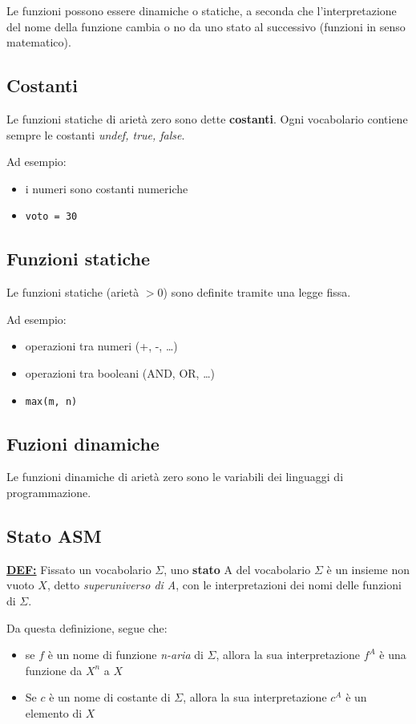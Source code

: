 \noindent Le funzioni possono essere dinamiche o statiche, a seconda che l'interpretazione 
del nome della funzione cambia o no da uno stato al successivo (funzioni 
in senso matematico).

\subsection{Costanti}
Le funzioni statiche di arietà zero sono dette \textbf{costanti}. Ogni 
vocabolario contiene sempre le costanti \textit{undef, true, false}.

\noindent Ad esempio:
\begin{itemize}
    \item i numeri sono costanti numeriche
    \item \texttt{voto = 30}
\end{itemize}


\subsection{Funzioni statiche}
Le funzioni statiche (arietà $>0$) sono definite tramite una legge fissa.

\noindent Ad esempio:
\begin{itemize}
    \item operazioni tra numeri (+, -, \dots)
    \item operazioni tra booleani (AND, OR, \dots)
    \item \texttt{max(m, n)}
\end{itemize}

\subsection{Fuzioni dinamiche}
Le funzioni dinamiche di arietà zero sono le variabili dei linguaggi 
di programmazione.

\subsection{Stato ASM}
\underline{\textbf{DEF:}} Fissato un vocabolario $\Sigma$, uno \textbf{stato} A del 
vocabolario $\Sigma$ è un insieme non vuoto $X$, detto \textit{superuniverso di A}, con 
le interpretazioni dei nomi delle funzioni di $\Sigma$.

\noindent Da questa definizione, segue che:
\begin{itemize}
    \item se $f$ è un nome di funzione \textit{n-aria} di $\Sigma$, allora 
    la sua interpretazione $f^A$ è una funzione da $X^n$ a $X$
    \item Se $c$ è un nome di costante di $\Sigma$, allora la sua interpretazione $c^A$ è un elemento di $X$
\end{itemize}

